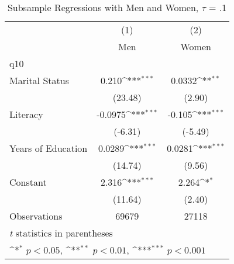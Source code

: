 \begin{table}[htbp]\centering
\def\sym#1{\ifmmode^{#1}\else\(^{#1}\)\fi}
\caption{Subsample Regressions with Men and Women, $\tau$ = .1}
\begin{tabular}{l*{2}{c}}
\hline\hline
                    &\multicolumn{1}{c}{(1)}&\multicolumn{1}{c}{(2)}\\
                    &\multicolumn{1}{c}{Men}&\multicolumn{1}{c}{Women}\\
\hline
q10                 &                     &                     \\
Marital Status      &       0.210\sym{***}&      0.0332\sym{**} \\
                    &     (23.48)         &      (2.90)         \\
[1em]
Literacy            &     -0.0975\sym{***}&      -0.105\sym{***}\\
                    &     (-6.31)         &     (-5.49)         \\
[1em]
Years of Education  &      0.0289\sym{***}&      0.0281\sym{***}\\
                    &     (14.74)         &      (9.56)         \\
[1em]
Constant            &       2.316\sym{***}&       2.264\sym{*}  \\
                    &     (11.64)         &      (2.40)         \\
\hline
Observations        &       69679         &       27118         \\
\hline\hline
\multicolumn{3}{l}{\footnotesize \textit{t} statistics in parentheses}\\
\multicolumn{3}{l}{\footnotesize \sym{*} \(p<0.05\), \sym{**} \(p<0.01\), \sym{***} \(p<0.001\)}\\
\end{tabular}
\end{table}
